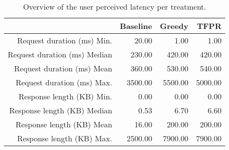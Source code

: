 \begin{table}[ht]
\centering
\begin{tabular}{rrrr}
  \hline
 & Baseline & Greedy & TFPR \\ 
  \hline
Request duration (ms) Min. & 20.00 & 1.00 & 1.00 \\ 
  Request duration (ms) Median & 230.00 & 420.00 & 420.00 \\ 
  Request duration (ms) Mean & 360.00 & 530.00 & 540.00 \\ 
  Request duration (ms) Max. & 3500.00 & 5500.00 & 5000.00 \\ 
  Response length (KB) Min. & 0.00 & 0.00 & 0.00 \\ 
  Response length (KB) Median & 0.53 & 6.70 & 6.60 \\ 
  Response length (KB) Mean & 16.00 & 200.00 & 200.00 \\ 
  Response length (KB) Max. & 2500.00 & 7900.00 & 7900.00 \\ 
   \hline
\end{tabular}
\caption{Overview of the user perceived latency per treatment.} 
\label{tab:results:rq2:summary:treatment}
\end{table}
